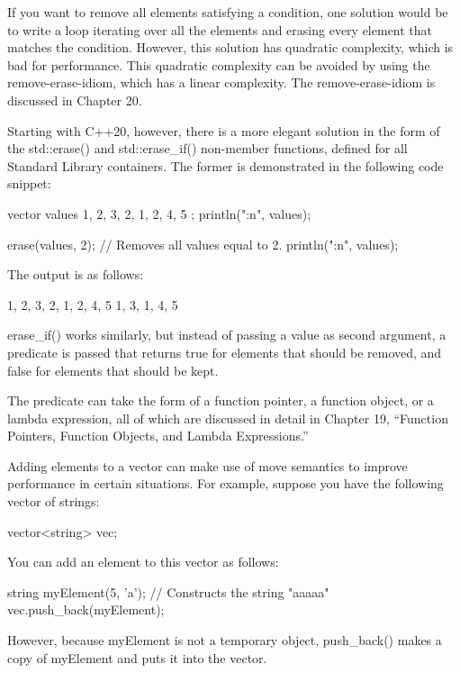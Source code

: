 If you want to remove all elements satisfying a condition, one solution would be to write a loop iterating over all the elements and erasing every element that matches the condition. However, this solution has quadratic complexity, which is bad for performance. This quadratic complexity can be avoided by using the remove-erase-idiom, which has a linear complexity. The remove-erase-idiom is discussed in Chapter 20.

Starting with C++20, however, there is a more elegant solution in the form of the std::erase() and std::erase\_if() non-member functions, defined for all Standard Library containers. The former is demonstrated in the following code snippet:

\begin{cpp}
vector values { 1, 2, 3, 2, 1, 2, 4, 5 };
println("{:n}", values);

erase(values, 2); // Removes all values equal to 2.
println("{:n}", values);
\end{cpp}

The output is as follows:

\begin{shell}
1, 2, 3, 2, 1, 2, 4, 5
1, 3, 1, 4, 5
\end{shell}

erase\_if() works similarly, but instead of passing a value as second argument, a predicate is passed that returns true for elements that should be removed, and false for elements that should be kept.

The predicate can take the form of a function pointer, a function object, or a lambda expression, all of which are discussed in detail in Chapter 19, “Function Pointers, Function Objects, and Lambda Expressions.”


Adding elements to a vector can make use of move semantics to improve performance in certain situations. For example, suppose you have the following vector of strings:

\begin{cpp}
vector<string> vec;
\end{cpp}

You can add an element to this vector as follows:

\begin{cpp}
string myElement(5, 'a'); // Constructs the string "aaaaa"
vec.push_back(myElement);
\end{cpp}

However, because myElement is not a temporary object, push\_back() makes a copy of myElement and puts it into the vector.

